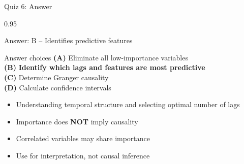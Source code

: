 \documentclass[9pt, aspectratio=169, t]{beamer}
\begin{document}
\begin{frame}{Quiz 6: Answer}
    \begin{cminipage}{0.95\textwidth}
    {\small
    \begin{exampleblock}{Answer: B -- Identifies predictive features}
    \begin{block}{Answer choices}
        \textcolor{MainBlue}{\textbf{(A)}} Eliminate all low-importance variables \incorrect\\[2pt]
        \textcolor{MainBlue}{\textbf{(B)}} \textbf{\textcolor{Forest}{Identify which lags and features are most predictive}} \correct\\[2pt]
        \textcolor{MainBlue}{\textbf{(C)}} Determine Granger causality \incorrect\\[2pt]
        \textcolor{MainBlue}{\textbf{(D)}} Calculate confidence intervals \incorrect
    \end{block}

        \vspace{0.1cm}

        \begin{itemize}\setlength{\itemsep}{0pt}
            \item Understanding temporal structure and selecting optimal number of lags
            \item Importance does \textbf{NOT} imply causality
            \item Correlated variables may share importance
            \item Use for interpretation, not causal inference
        \end{itemize}
    \end{exampleblock}
    }
    \end{cminipage}
\end{frame}
\end{document}
